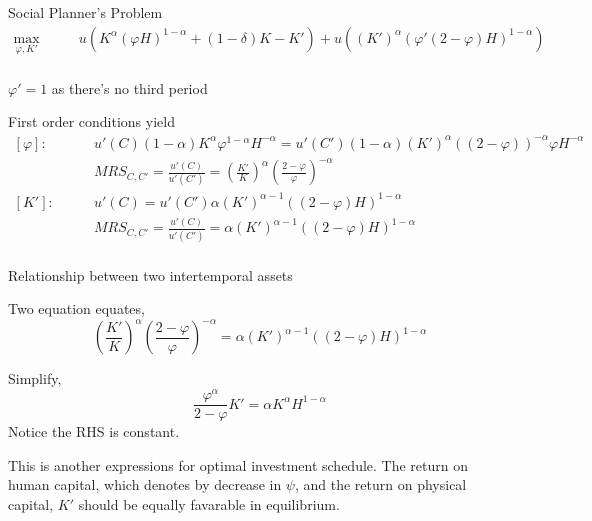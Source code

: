 \documentclass[11pt,aspectratio=169,usenames,dvipsnames]{beamer}
\let\tempone\itemize
\let\temptwo\enditemize
\renewenvironment{itemize}{\tempone\addtolength{\itemsep}{\fill}}{\temptwo}
\begin{document}
\begin{frame}{Social Planner's Problem}
\label{slide:Social_Planner_s_Problem}
    \[
        \begin{split}
            \max_{\varphi, K'}
                & \qquad u(K^{\alpha} (\varphi H)^{1 - \alpha} + (1 - \delta)K - K') + u((K')^{\alpha}(\varphi' (2 - \varphi) H)^{1-\alpha})
            \\
        \end{split}
    \]
    \begin{itemize}
        \item $ \varphi' = 1$ as there's no third period
        \item First order conditions yield
        \[
            \begin{split}
                [\varphi]:
                    & \qquad u'(C) (1 - \alpha) K^{\alpha} \varphi^{1-\alpha} H^{-\alpha} = u'(C') (1 - \alpha) (K')^{\alpha} ((2 - \varphi))^{-\alpha} \varphi H^{-\alpha}
                \\
                    & \qquad MRS_{C, C'} = \frac{u'(C)}{u'(C')} = \left(
                        \frac{K'}{K}
                    \right)^{\alpha} \left(
                        \frac{2 - \varphi}{\varphi}
                    \right)^{-\alpha}
                \\
                [K']:
                    & \qquad u'(C) = u'(C') \alpha (K')^{\alpha-1} ((2 - \varphi)H)^{1-\alpha}
                \\
                    & \qquad MRS_{C, C'} = \frac{u'(C)}{u'(C')} = \alpha (K')^{\alpha-1} ((2 - \varphi)H)^{1-\alpha}
                \\
            \end{split}
        \]
    \end{itemize}
\end{frame}

\begin{frame}{Relationship between two intertemporal assets}
\label{slide:Relationship_between_two_intertemporal_assets}
\begin{itemize}
    \item Two equation equates,
    \[
        \left(
                        \frac{K'}{K}
                    \right)^{\alpha} \left(
                        \frac{2 - \varphi}{\varphi}
                    \right)^{-\alpha}
                    = \alpha (K')^{\alpha-1} ((2 - \varphi)H)^{1-\alpha}
    \]
    \item Simplify,
    \[
        \frac{\varphi^{\alpha}}{2 - \varphi} K' = \alpha K^{\alpha} H^{1-\alpha}
    \]
    Notice the RHS is constant.
    \item This is another expressions for optimal investment schedule. The return on human capital, which denotes by decrease in $ \psi $, and the return on physical capital, $ K' $ should be equally favarable in equilibrium.
\end{itemize}
\end{frame}
\end{document}
